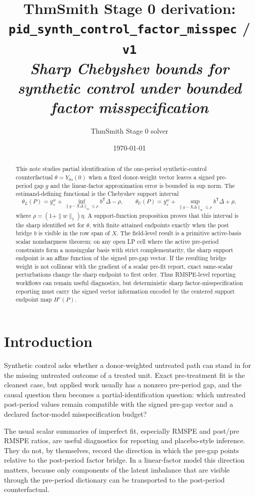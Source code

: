 \documentclass[11pt]{article}
\title{ThmSmith Stage 0 derivation: \texttt{pid\_synth\_control\_factor\_misspec} / \texttt{v1}%
  \\ \large\textit{Sharp Chebyshev bounds for synthetic control under bounded factor misspecification}}
\author{ThmSmith Stage 0 solver}
\date{\today}
\newcommand{\transpose}{\mathsf{T}}
\theoremstyle{definition}
\theoremstyle{plain}
\theoremstyle{remark}
\begin{document}
\maketitle


\begin{abstract}
This note studies partial identification of the one-period synthetic-control
counterfactual \(\theta=Y_{0s}(0)\) when a fixed donor-weight vector leaves a
signed pre-period gap \(g\) and the linear-factor approximation error is bounded
in sup norm.  The estimand-defining functional is the Chebyshev support interval
\[
\theta_L(P)=y_s^w+\inf_{\|g-X\Delta\|_\infty\le\rho}b^\transpose\Delta-\rho,
\qquad
\theta_U(P)=y_s^w+\sup_{\|g-X\Delta\|_\infty\le\rho}b^\transpose\Delta+\rho,
\]
where \(\rho=(1+\|w\|_1)\eta\).  A support-function proposition proves that this
interval is the sharp identified set for \(\theta\), with finite attained
endpoints exactly when the post bridge \(b\) is visible in the row span of \(X\).
The field-level result is a primitive active-basis scalar nonsharpness theorem:
on any open LP cell where the active pre-period constraints form a nonsingular
basis with strict complementarity, the sharp support endpoint is an affine
function of the signed pre-gap vector.  If the resulting bridge weight is not
collinear with the gradient of a scalar pre-fit report, exact same-scalar
perturbations change the sharp endpoint to first order.  Thus RMSPE-level
reporting workflows can remain useful diagnostics, but deterministic sharp
factor-misspecification reporting must carry the signed vector information
encoded by the centered support endpoint map \(H^c(P)\).
\end{abstract}

\section{Introduction}
Synthetic control asks whether a donor-weighted untreated path can stand in for
the missing untreated outcome of a treated unit.  Exact pre-treatment fit is the
cleanest case, but applied work usually has a nonzero pre-period gap, and the
causal question then becomes a partial-identification question: which untreated
post-period values remain compatible with the signed pre-gap vector and a
declared factor-model misspecification budget?

The usual scalar summaries of imperfect fit, especially RMSPE and post/pre
RMSPE ratios, are useful diagnostics for reporting and placebo-style inference.
They do not, by themselves, record the direction in which the pre-gap points
relative to the post-period factor bridge.  In a linear-factor model this
direction matters, because only components of the latent imbalance that are
visible through the pre-period dictionary can be transported to the post-period
counterfactual.
\end{document}
